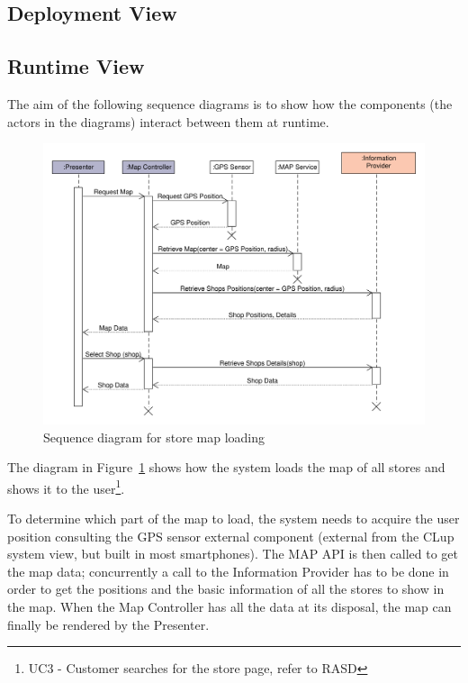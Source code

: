 \subsection{Deployment View}

\clearpage
\subsection{Runtime View}
The aim of the following sequence diagrams is to show how the components (the actors in the diagrams) interact between them at runtime. 
\begin{figure}[H]
    \includegraphics[width=\textwidth]{Images/UML_user_map_sequence.pdf}
    \caption{\label{fig:UML_user_map_sequence}Sequence diagram for store map loading}
\end{figure}
The diagram in Figure~\ref{fig:UML_user_map_sequence} shows how the system loads the map of all stores and shows it to the user\footnote{UC3 - Customer searches for the store page, refer to RASD}.

To determine which part of the map to load, the system needs to acquire the user position consulting the GPS sensor external component (external from the CLup system view, but built in most smartphones). The MAP API is then called to get the map data; concurrently a call to the Information Provider has to be done in order to get the positions and the basic information of all the stores to show in the map. When the Map Controller has all the data at its disposal, the map can finally be rendered by the Presenter. 

